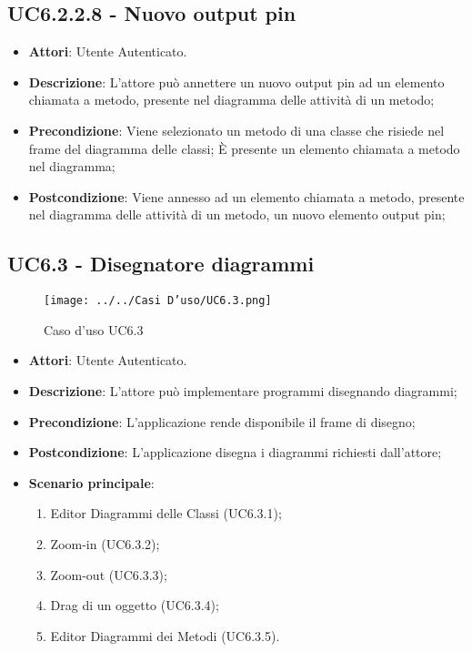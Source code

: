 \subsection{UC6.2.2.8 - Nuovo output pin} 
\label{ssec:UC6.2.2.8} 
\begin{itemize} 
\item \textbf{Attori}: Utente Autenticato.
\item \textbf{Descrizione}: L'attore può annettere un nuovo output pin ad un elemento chiamata a metodo, presente nel diagramma delle attività di un metodo;
\item \textbf{Precondizione}: Viene selezionato un metodo di una classe che risiede nel frame del diagramma delle  classi; È presente un elemento chiamata a metodo nel diagramma;
\item \textbf{Postcondizione}: Viene annesso ad un elemento chiamata a metodo, presente nel diagramma delle attività di un metodo, un nuovo elemento output pin;
\end{itemize} 
\subsection{UC6.3 - Disegnatore diagrammi} 
\label{ssec:UC6.3} 
\begin{figure}[h!] 
\centering 
\texttt{[image: ../../Casi D'uso/UC6.3.png]} 
\caption{Caso d'uso UC6.3} 
 \end{figure} 
\begin{itemize} 
\item \textbf{Attori}: Utente Autenticato.
\item \textbf{Descrizione}: L'attore può implementare programmi disegnando diagrammi;
\item \textbf{Precondizione}: L'applicazione rende disponibile il frame di disegno;
\item \textbf{Postcondizione}: L'applicazione disegna i diagrammi richiesti dall'attore;
\item \textbf{Scenario principale}: \begin{enumerate}\item Editor Diagrammi delle Classi (UC6.3.1);\item Zoom-in (UC6.3.2);\item Zoom-out (UC6.3.3);\item Drag di un oggetto (UC6.3.4);\item Editor Diagrammi dei Metodi (UC6.3.5). 
 \end{enumerate}
\end{itemize} 
